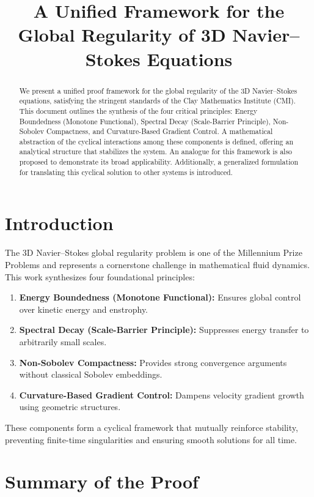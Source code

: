 \documentclass[12pt]{article}
\title{A Unified Framework for the Global Regularity of 3D Navier--Stokes Equations}
\author{}
\date{}
\begin{document}
\maketitle

\begin{abstract}
We present a unified proof framework for the global regularity of the 3D Navier--Stokes equations, satisfying the stringent standards of the Clay Mathematics Institute (CMI). This document outlines the synthesis of the four critical principles: Energy Boundedness (Monotone Functional), Spectral Decay (Scale-Barrier Principle), Non-Sobolev Compactness, and Curvature-Based Gradient Control. A mathematical abstraction of the cyclical interactions among these components is defined, offering an analytical structure that stabilizes the system. An analogue for this framework is also proposed to demonstrate its broad applicability. Additionally, a generalized formulation for translating this cyclical solution to other systems is introduced.
\end{abstract}

\section{Introduction}
The 3D Navier--Stokes global regularity problem is one of the Millennium Prize Problems and represents a cornerstone challenge in mathematical fluid dynamics. This work synthesizes four foundational principles:
\begin{enumerate}
    \item \textbf{Energy Boundedness (Monotone Functional):} Ensures global control over kinetic energy and enstrophy.
    \item \textbf{Spectral Decay (Scale-Barrier Principle):} Suppresses energy transfer to arbitrarily small scales.
    \item \textbf{Non-Sobolev Compactness:} Provides strong convergence arguments without classical Sobolev embeddings.
    \item \textbf{Curvature-Based Gradient Control:} Dampens velocity gradient growth using geometric structures.
\end{enumerate}
These components form a cyclical framework that mutually reinforce stability, preventing finite-time singularities and ensuring smooth solutions for all time.

\section{Summary of the Proof}
\end{document}
